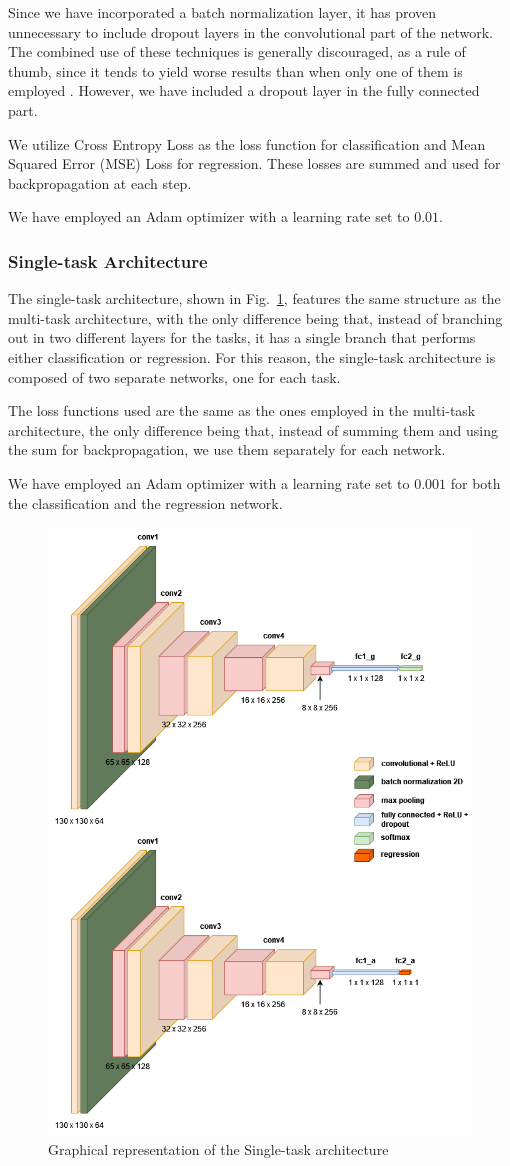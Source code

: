 Since we have incorporated a batch normalization layer,
it has proven unnecessary to include dropout layers in the convolutional part
of the network.
The combined use of these techniques is generally discouraged,
as a rule of thumb, since it tends to yield worse results than
when only one of them is employed \cite{app3}.
However, we have included a dropout layer in the fully connected part.

We utilize Cross Entropy Loss as the loss function for classification
and Mean Squared Error (MSE) Loss for regression.
These losses are summed and used for backpropagation at each step.

We have employed an Adam optimizer with a learning rate set to $0.01$.

\subsubsection{Single-task Architecture} \label{sec:single}

The single-task architecture, shown in Fig.~\ref{cnn2},
features the same structure as the multi-task architecture,
with the only difference being that, instead of branching out
in two different layers for the tasks, it has a single branch
that performs either classification or regression.
For this reason, the single-task architecture is composed of
two separate networks, one for each task.

The loss functions used are the same as the ones employed
in the multi-task architecture, the only difference being
that, instead of summing them and using the sum for backpropagation,
we use them separately for each network.

We have employed an Adam optimizer with a learning rate set to $0.001$
for both the classification and the regression network.

\begin{figure}[htbp]
    \centerline{\includegraphics[width=.5\textwidth]{images/single_cnn.png}}
    \caption{Graphical representation of the Single-task architecture}
    \label{cnn2}
\end{figure}
